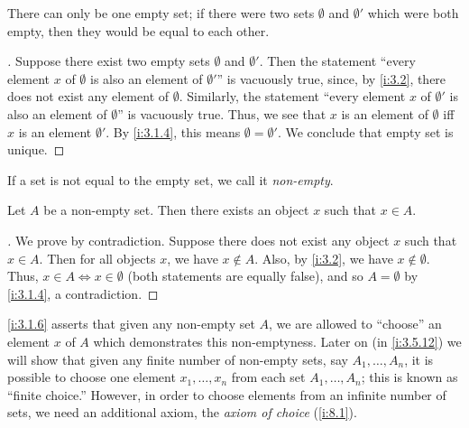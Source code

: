 \begin{ac}\label{i:ac:3.1.2}
  There can only be one empty set;
  if there were two sets \(\emptyset\) and \(\emptyset'\) which were both empty, then they would be equal to each other.
\end{ac}

\begin{proof}[]
  Suppose there exist two empty sets \(\emptyset\) and \(\emptyset'\).
  Then the statement ``every element \(x\) of \(\emptyset\) is also an element of \(\emptyset'\)'' is vacuously true, since, by \cref{i:3.2}, there does not exist any element of \(\emptyset\).
  Similarly, the statement ``every element \(x\) of \(\emptyset'\) is also an element of \(\emptyset\)'' is vacuously true.
  Thus, we see that \(x\) is an element of \(\emptyset\) iff \(x\) is an element \(\emptyset'\).
  By \cref{i:3.1.4}, this means \(\emptyset = \emptyset'\).
  We conclude that empty set is unique.
\end{proof}

\begin{note}
  If a set is not equal to the empty set, we call it \emph{non-empty}.
\end{note}

\setcounter{thm}{5}
\begin{lem}\label{i:3.1.6}
  Let \(A\) be a non-empty set.
  Then there exists an object \(x\) such that \(x \in A\).
\end{lem}

\begin{proof}[]
  We prove by contradiction.
  Suppose there does not exist any object \(x\) such that \(x \in A\).
  Then for all objects \(x\), we have \(x \notin A\).
  Also, by \cref{i:3.2}, we have \(x \notin \emptyset\).
  Thus, \(x \in A \iff x \in \emptyset\) (both statements are equally false), and so \(A = \emptyset\) by \cref{i:3.1.4}, a contradiction.
\end{proof}

\begin{rmk}\label{i:3.1.7}
  \cref{i:3.1.6} asserts that given any non-empty set \(A\), we are allowed to ``choose'' an element \(x\) of \(A\) which demonstrates this non-emptyness.
  Later on (in \cref{i:3.5.12}) we will show that given any finite number of non-empty sets, say \(A_1, \dots, A_n\), it is possible to choose one element \(x_1, \dots, x_n\) from each set \(A_1, \dots, A_n\);
  this is known as ``finite choice.''
  However, in order to choose elements from an infinite number of sets, we need an additional axiom, the \emph{axiom of choice} (\cref{i:8.1}).
\end{rmk}

